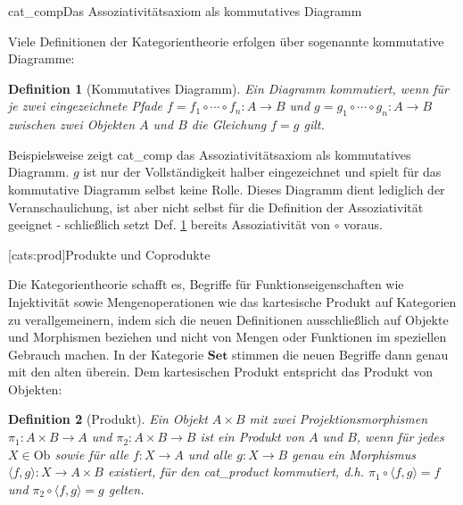 \documentclass[11pt, a4paper, bibgerm]{book}
\newcommand\lsection{}
\newcommand\abb{}
\newcommand\fig{}
\newcommand\ato{\rightarrow} %
\newtheorem{defini}{Definition}
\newcommand{\defi}[2]{%
  \begin{defini}[#1]
    \label{def:#1}
    #2
  \end{defini}
}
\newcommand{\dref}[1]{Def. \ref{def:#1}}
\begin{document}
\fig{cat_comp}{Das Assoziativitätsaxiom als kommutatives Diagramm}

Viele Definitionen der Kategorientheorie erfolgen über sogenannte
kommutative Diagramme:

\defi{Kommutatives Diagramm}{ Ein Diagramm kommutiert, wenn
  für je zwei eingezeichnete Pfade $f=f_1 \circ \cdots \circ f_n : A
  \rightarrow B$ und $g=g_1 \circ \cdots \circ g_n : A \rightarrow B$
  zwischen zwei Objekten $A$ und $B$ die Gleichung $f=g$ gilt.  }
Beispielsweise zeigt \abb{cat_comp} das Assoziativitätsaxiom als
kommutatives Diagramm. $g$ ist nur der Vollständigkeit halber
eingezeichnet und spielt für das kommutative Diagramm selbst keine
Rolle. Dieses Diagramm dient lediglich der Veranschaulichung, ist aber
nicht selbst für die Definition der Assoziativität geeignet -
schließlich setzt \dref{Kommutatives Diagramm} bereits Assoziativität
von $\circ$ voraus.

\lsection[cats:prod]{Produkte und Coprodukte}

Die Kategorientheorie schafft es, Begriffe für Funktionseigenschaften
wie Injektivität sowie Mengenoperationen wie das kartesische Produkt auf
Kategorien zu verallgemeinern, indem sich die neuen Definitionen
ausschließlich auf Objekte und Morphismen beziehen und nicht von Mengen
oder Funktionen im speziellen Gebrauch machen. In der Kategorie
$\mathbf{Set}$ stimmen die neuen Begriffe dann genau mit den alten
überein. Dem kartesischen Produkt entspricht das Produkt von Objekten:

\defi{Produkt}{ Ein Objekt $A \times B$ mit zwei Projektionsmorphismen
  $\pi_1 : A \times B \ato A$ und $\pi_2 : A \times B \ato B$ ist ein
  Produkt von $A$ und $B$, wenn für jedes $X \in \mathrm{Ob}$ sowie für
  alle $f : X \ato A$ und alle $g : X \ato B$ genau ein Morphismus
  $\langle f,g \rangle : X \ato A \times B$ existiert, für den
  \abb{cat_product} kommutiert, d.h.  $\pi_1 \circ \langle f,g \rangle =
  f$ und $\pi_2 \circ \langle f,g \rangle = g$ gelten.  }
\end{document}
